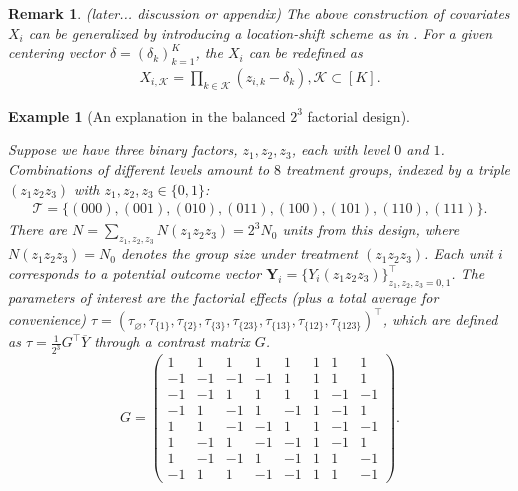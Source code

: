 \documentclass[12pt]{article}
\newtheorem{remark}{Remark}
\newtheorem{example}{Example}
\begin{document}
{
\color{red} 
\begin{remark}
(later... discussion or appendix) The above construction of covariates ${X}_i$ can be generalized by introducing a location-shift scheme as in \cite{zhao2021regression}. For a given centering vector ${\delta}=(\delta_k)_{k=1}^K$, the ${X}_i$ can be redefined as
\begin{align*}
X_{i,\mathcal{K}} = \prod_{k\in\mathcal{K}}\left(z_{i,k}-\delta_k\right),\mathcal{K}\subset [K].
\end{align*}
\end{remark}
}



\begin{example}[An explanation in the balanced $2^3$ factorial design]\label{exp:2-3-fac-design}



Suppose we have three binary factors, $z_1,z_2,z_3$, each with level $0$ and $1$. Combinations of different levels amount to $8$ treatment groups, indexed by a triple $(z_1z_2z_3)$ with $z_1,z_2,z_3\in\{0,1\}$:
\begin{align*}
\mathcal{T} = \{(000), (001), (010),(011),(100), (101), (110),(111)\}.
\end{align*}
There are $N=\sum_{z_1,z_2,z_3}N(z_1z_2z_3) = 2^3 N_0 $ units from this design, where $N(z_1z_2z_3) = N_0$ denotes the group size under treatment $(z_1z_2z_3)$. Each unit $i$ corresponds to a potential outcome vector $\bm{Y}_i = \{Y_i(z_1z_2z_3)\}_{z_1,z_2,z_3=0,1}^\top$. The  parameters of interest are the factorial effects (plus a total average for convenience) ${\tau}=\left(\tau_\varnothing, \tau_{\{1\}},\tau_{\{2\}},\tau_{\{3\}}, \tau_{\{23\}}, \tau_{\{13\}}, \tau_{\{12\}}, \tau_{\{123\}}\right)^\top$, which are defined as ${\tau} = \frac{1}{2^3} {G}^\top\overline{Y}$ through a contrast matrix ${G}$. 
\[
{G} = 
\begin{pmatrix}
1  & 1  & 1  & 1  & 1 & 1 & 1 & 1\\ 
-1 & -1 & -1 & -1 & 1 & 1 & 1 & 1\\
-1 & -1 & 1 & 1 & 1 & 1 & -1 & -1\\
-1 & 1 & -1 & 1 & -1 & 1 & -1 & 1\\
1 & 1 & -1 & -1 & 1 & 1 & -1 & -1\\
1 & -1 & 1 & -1 & -1 & 1 & -1 & 1\\
1 & -1 & -1 & 1 & -1 & 1 & 1 & -1\\
-1 & 1 & 1 & -1 & -1 & 1 & 1 & -1
\end{pmatrix}.
\]


\end{example}
\end{document}
